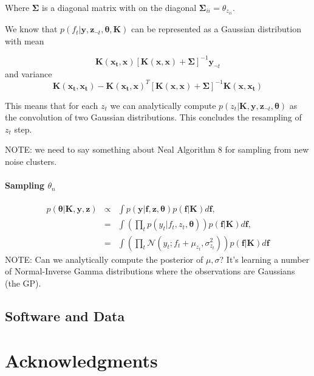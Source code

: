 \documentclass{article}
\begin{document}
Where $\bm{\Sigma}$ is a diagonal matrix with on the diagonal $\bm{\Sigma}_{ii} = \theta_{z_{ii}}$.

We know that \cite{gpml} $p(f_t | \bm{y}, \bm{z}_{\lnot t}, \bm{\theta}, \bm{K})$ can be represented as a Gaussian distribution with mean

\begin{equation}
\bm{K}(\bm{x_t}, \bm{x}) \left[ \bm{K}(\bm{x}, \bm{x}) + \bm{\Sigma} \right]^{-1} \bm{y}_{\lnot t}
\end{equation}
and variance
\begin{equation}
\bm{K}(\bm{x_t},\bm{x_t}) - \bm{K}(\bm{x_t}, \bm{x})^T \left[ \bm{K}(\bm{x}, \bm{x}) + \bm{\Sigma} \right]^{-1} \bm{K}(\bm{x},\bm{x_t})
\end{equation}

This means that for each $z_t$ we can analytically compute $p(z_t | \bm{K}, \bm{y}, \bm{z}_{\lnot t}, \bm{\theta})$ as the convolution of two Gaussian distributions. This concludes the resampling of $z_t$ step.

NOTE: we need to say something about Neal Algorithm 8 for sampling from new noise clusters.


\paragraph{Sampling $\theta_n$}

\begin{eqnarray}
p(\bm{\theta} | \bm{K}, \bm{y}, \bm{z}) & \propto & \int p(\bm{y} | \bm{f}, \bm{z}, \bm{\theta}) p(\bm{f} | \bm{K}) d \bm{f}, \\
& = & \int \left( \prod_t p(y_t | f_t, z_t, \bm{\theta}) \right) p(\bm{f} | \bm{K}) d \bm{f}, \\
& = & \int \left( \prod_t \mathcal{N}(y_t; f_t + \mu_{z_t}, \sigma^2_{z_t}) \right) p(\bm{f} | \bm{K}) d \bm{f}
\end{eqnarray}
NOTE: Can we analytically compute the posterior of $\mu,\sigma$? It's learning a number of Normal-Inverse Gamma distributions where the observations are Gaussians (the GP).






\subsection{Software and Data}


\section*{Acknowledgments} 



\end{document}
